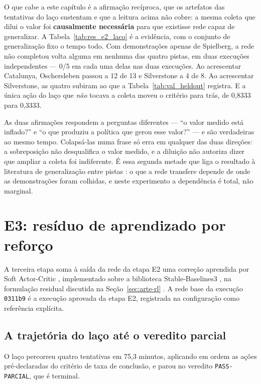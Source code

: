 O que cabe a este capítulo é a afirmação recíproca, que os artefatos das
tentativas do laço sustentam e que a leitura acima não cobre: a mesma coleta que
dilui o valor foi \textbf{causalmente necessária} para que existisse rede capaz
de generalizar. A Tabela~\ref{tab:res_e2_laco} é a evidência, com o conjunto de
generalização fixo o tempo todo. Com demonstrações apenas de Spielberg, a rede
não completou volta alguma em nenhuma das quatro pistas, em duas execuções
independentes --- 0/5 em cada uma delas nas duas execuções. Ao acrescentar
Catalunya, Oschersleben passou a 12 de 13 e Silverstone a 4 de 8. Ao acrescentar
Silverstone, as quatro subiram ao que a Tabela~\ref{tab:val_heldout} registra. E
a única ação do laço que \textit{não} tocava a coleta moveu o critério para
trás, de 0,8333 para 0,3333.

As duas afirmações respondem a perguntas diferentes --- ``o valor medido está
inflado?'' e ``o que produziu a política que gerou esse valor?'' --- e são
verdadeiras ao mesmo tempo. Colapsá-las numa frase só erra em qualquer das duas
direções: a sobreposição não desqualifica o valor medido, e a diluição não
autoriza dizer que ampliar a coleta foi indiferente. É essa segunda metade que
liga o resultado à literatura de generalização entre pistas
\cite{Bosello2022CrossTrack}: o que a rede transfere depende de onde as
demonstrações foram colhidas, e neste experimento a dependência é total, não
marginal.

\section{E3: resíduo de aprendizado por reforço}\label{sec:res-e3}

A terceira etapa soma à saída da rede da etapa E2 uma correção aprendida por Soft
Actor-Critic \cite{Haarnoja2018SAC}, implementado sobre a biblioteca
Stable-Baselines3 \cite{Raffin2021SB3}, na formulação residual discutida na
Seção~\ref{sec:arte-rl} \cite{Johannink2019Residual, Silver2018ResidualPolicy}.
A rede base da execução \texttt{0311b9} é a execução aprovada da etapa E2,
registrada na configuração como referência explícita.

\subsection{A trajetória do laço até o veredito parcial}

O laço percorreu quatro tentativas em 75,3 minutos, aplicando em ordem as ações
pré-declaradas do critério de taxa de conclusão, e parou no veredito
\texttt{PASS-PARCIAL}, que é terminal.

